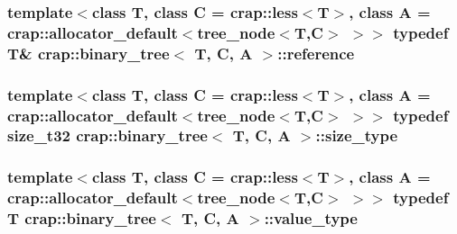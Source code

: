 \hypertarget{classcrap_1_1binary__tree_ad64c4256e3563cf0f8147ba5927018a1}{
\subsubsection[{reference}]{\setlength{\rightskip}{0pt plus 5cm}template$<$class T, class C = crap\-::less$<$\-T$>$, class A = crap\-::allocator\-\_\-default$<$tree\-\_\-node$<$\-T,\-C$>$ $>$$>$ typedef T\& {\bf crap\-::binary\-\_\-tree}$<$ T, C, A $>$\-::{\bf reference}}}\label{classcrap_1_1binary__tree_ad64c4256e3563cf0f8147ba5927018a1}
\hypertarget{classcrap_1_1binary__tree_a7157228ff412e3fcf54a972120b7186a}{
\subsubsection[{size\-\_\-type}]{\setlength{\rightskip}{0pt plus 5cm}template$<$class T, class C = crap\-::less$<$\-T$>$, class A = crap\-::allocator\-\_\-default$<$tree\-\_\-node$<$\-T,\-C$>$ $>$$>$ typedef {\bf size\-\_\-t32} {\bf crap\-::binary\-\_\-tree}$<$ T, C, A $>$\-::{\bf size\-\_\-type}}}\label{classcrap_1_1binary__tree_a7157228ff412e3fcf54a972120b7186a}
\hypertarget{classcrap_1_1binary__tree_a960493f90034de3a093bcbd5213afc7b}{
\subsubsection[{value\-\_\-type}]{\setlength{\rightskip}{0pt plus 5cm}template$<$class T, class C = crap\-::less$<$\-T$>$, class A = crap\-::allocator\-\_\-default$<$tree\-\_\-node$<$\-T,\-C$>$ $>$$>$ typedef T {\bf crap\-::binary\-\_\-tree}$<$ T, C, A $>$\-::{\bf value\-\_\-type}}}\label{classcrap_1_1binary__tree_a960493f90034de3a093bcbd5213afc7b}


